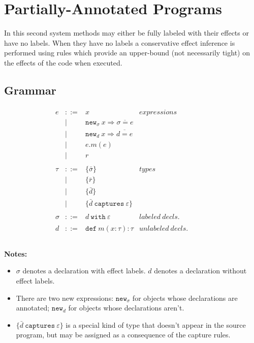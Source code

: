 \documentclass{llncs}
\newcommand{\keywadj}[1]{\mathtt{#1}}
\newcommand{\keyw}[1]{\keywadj{#1}~}
\begin{document}
\newpage



\section{Partially-Annotated Programs}

In this second system methods may either be fully labeled with their effects or have no labels. When they have no labels a conservative effect inference is performed using rules which provide an upper-bound (not necessarily tight) on the effects of the code when executed.

\subsection{Grammar}

\[
\begin{array}{lll}

\begin{array}{lllr}

e & ::= & x & expressions \\
		& | & \keywadj{new}_\sigma~x \Rightarrow \overline{\sigma = e} \\
 		& | & \keywadj{new}_d~x \Rightarrow \overline{d = e} \\
 		& | & e.m(e)\\
  		& | & r \\
		&&\\

\tau & ::= & \{ \bar \sigma \} & types \\
		& | & \{ \bar r \} \\
		& | & \{ \bar d \} \\
		& | & \{ \bar d ~\keyw{captures} \varepsilon \} \\
		&&\\
		
\sigma & ::= & d~\keyw{with}\varepsilon  & labeled~ decls.\\
		&&\\

d & ::= & \keyw{def} m(x:\tau):\tau & unlabeled~decls.\\
		&&\\

\end{array}
& ~~~~~~
&
\end{array}
\]

\noindent \textbf{Notes:}
\begin{itemize}
	\item $\sigma$ denotes a declaration with effect labels. $d$ denotes a declaration without effect labels.
	\item There are two new expressions: $\keywadj{new}_\sigma$ for objects whose declarations are annotated; $\keywadj{new}_d$ for objects whose declarations aren't.
	\item $\{ \bar d ~\keyw{captures} \varepsilon \}$ is a special kind of type that doesn't appear in the source program, but may be assigned as a consequence of the capture rules.
\end{itemize}
\end{document}
